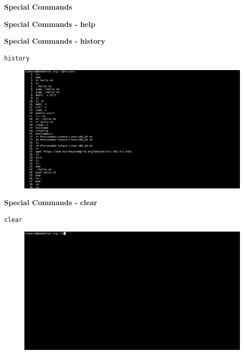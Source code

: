 \documentclass[ignorenonframetext,]{beamer}
\begin{document}
\begin{frame}[fragile]{\textbf{Special Commands}}
\begin{block}{\textbf{Special Commands - {\textbf{help}}}}
\end{block}

\begin{block}{\textbf{Special Commands - {\textbf{history}}}}

\begin{verbatim}
history
\end{verbatim}

\begin{figure}
\centering
\includegraphics{history.png}
\caption{}
\end{figure}

\end{block}

\begin{block}{\textbf{Special Commands - {\textbf{clear}}}}

\begin{verbatim}
clear
\end{verbatim}

\begin{figure}
\centering
\includegraphics{clear.png}
\caption{}
\end{figure}

\end{block}


\end{frame}
\end{document}
